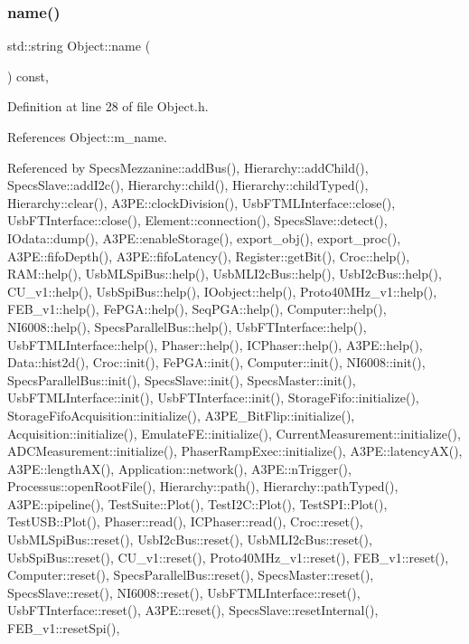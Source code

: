 \subsubsection{\texorpdfstring{name()}{name()}}
{\footnotesize\ttfamily std\+::string Object\+::name (\begin{DoxyParamCaption}{ }\end{DoxyParamCaption}) const\hspace{0.3cm}{\ttfamily [inline]}, {\ttfamily [inherited]}}



Definition at line 28 of file Object.\+h.



References Object\+::m\+\_\+name.



Referenced by Specs\+Mezzanine\+::add\+Bus(), Hierarchy\+::add\+Child(), Specs\+Slave\+::add\+I2c(), Hierarchy\+::child(), Hierarchy\+::child\+Typed(), Hierarchy\+::clear(), A3\+P\+E\+::clock\+Division(), Usb\+F\+T\+M\+L\+Interface\+::close(), Usb\+F\+T\+Interface\+::close(), Element\+::connection(), Specs\+Slave\+::detect(), I\+Odata\+::dump(), A3\+P\+E\+::enable\+Storage(), export\+\_\+obj(), export\+\_\+proc(), A3\+P\+E\+::fifo\+Depth(), A3\+P\+E\+::fifo\+Latency(), Register\+::get\+Bit(), Croc\+::help(), R\+A\+M\+::help(), Usb\+M\+L\+Spi\+Bus\+::help(), Usb\+M\+L\+I2c\+Bus\+::help(), Usb\+I2c\+Bus\+::help(), C\+U\+\_\+v1\+::help(), Usb\+Spi\+Bus\+::help(), I\+Oobject\+::help(), Proto40\+M\+Hz\+\_\+v1\+::help(), F\+E\+B\+\_\+v1\+::help(), Fe\+P\+G\+A\+::help(), Seq\+P\+G\+A\+::help(), Computer\+::help(), N\+I6008\+::help(), Specs\+Parallel\+Bus\+::help(), Usb\+F\+T\+Interface\+::help(), Usb\+F\+T\+M\+L\+Interface\+::help(), Phaser\+::help(), I\+C\+Phaser\+::help(), A3\+P\+E\+::help(), Data\+::hist2d(), Croc\+::init(), Fe\+P\+G\+A\+::init(), Computer\+::init(), N\+I6008\+::init(), Specs\+Parallel\+Bus\+::init(), Specs\+Slave\+::init(), Specs\+Master\+::init(), Usb\+F\+T\+M\+L\+Interface\+::init(), Usb\+F\+T\+Interface\+::init(), Storage\+Fifo\+::initialize(), Storage\+Fifo\+Acquisition\+::initialize(), A3\+P\+E\+\_\+\+Bit\+Flip\+::initialize(), Acquisition\+::initialize(), Emulate\+F\+E\+::initialize(), Current\+Measurement\+::initialize(), A\+D\+C\+Measurement\+::initialize(), Phaser\+Ramp\+Exec\+::initialize(), A3\+P\+E\+::latency\+A\+X(), A3\+P\+E\+::length\+A\+X(), Application\+::network(), A3\+P\+E\+::n\+Trigger(), Processus\+::open\+Root\+File(), Hierarchy\+::path(), Hierarchy\+::path\+Typed(), A3\+P\+E\+::pipeline(), Test\+Suite\+::\+Plot(), Test\+I2\+C\+::\+Plot(), Test\+S\+P\+I\+::\+Plot(), Test\+U\+S\+B\+::\+Plot(), Phaser\+::read(), I\+C\+Phaser\+::read(), Croc\+::reset(), Usb\+M\+L\+Spi\+Bus\+::reset(), Usb\+I2c\+Bus\+::reset(), Usb\+M\+L\+I2c\+Bus\+::reset(), Usb\+Spi\+Bus\+::reset(), C\+U\+\_\+v1\+::reset(), Proto40\+M\+Hz\+\_\+v1\+::reset(), F\+E\+B\+\_\+v1\+::reset(), Computer\+::reset(), Specs\+Parallel\+Bus\+::reset(), Specs\+Master\+::reset(), Specs\+Slave\+::reset(), N\+I6008\+::reset(), Usb\+F\+T\+M\+L\+Interface\+::reset(), Usb\+F\+T\+Interface\+::reset(), A3\+P\+E\+::reset(), Specs\+Slave\+::reset\+Internal(), F\+E\+B\+\_\+v1\+::reset\+Spi(), 